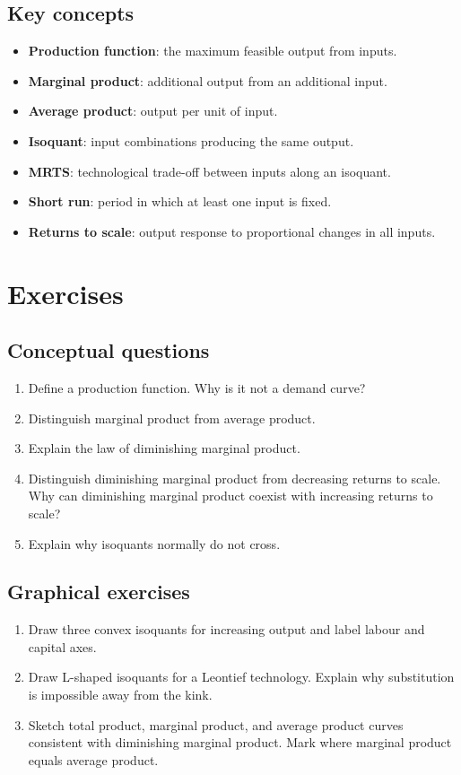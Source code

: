 \subsection*{Key concepts}
\begin{itemize}
  \item \textbf{Production function}: the maximum feasible output from inputs.
  \item \textbf{Marginal product}: additional output from an additional input.
  \item \textbf{Average product}: output per unit of input.
  \item \textbf{Isoquant}: input combinations producing the same output.
  \item \textbf{MRTS}: technological trade-off between inputs along an isoquant.
  \item \textbf{Short run}: period in which at least one input is fixed.
  \item \textbf{Returns to scale}: output response to proportional changes in all inputs.
\end{itemize}

\section*{Exercises}

\subsection*{Conceptual questions}
\begin{enumerate}[label=\arabic*.]
  \item Define a production function. Why is it not a demand curve?
  \item Distinguish marginal product from average product.
  \item Explain the law of diminishing marginal product.
  \item Distinguish diminishing marginal product from decreasing returns to scale. Why can diminishing marginal product coexist with increasing returns to scale?
  \item Explain why isoquants normally do not cross.
\end{enumerate}

\subsection*{Graphical exercises}
\begin{enumerate}[resume,label=\arabic*.]
  \item Draw three convex isoquants for increasing output and label labour and capital axes.
  \item Draw L-shaped isoquants for a Leontief technology. Explain why substitution is impossible away from the kink.
  \item Sketch total product, marginal product, and average product curves consistent with diminishing marginal product. Mark where marginal product equals average product.
\end{enumerate}

